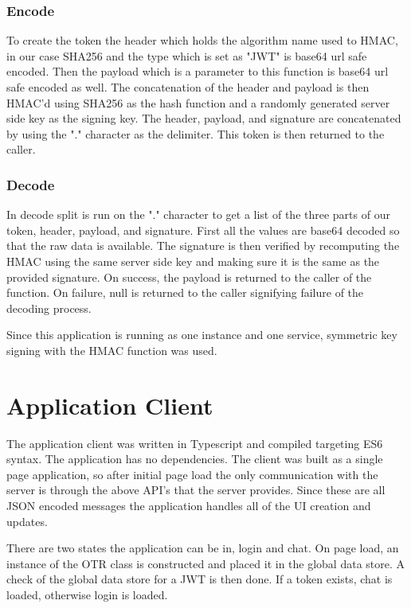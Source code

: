 \subsubsection{Encode}


To create the token the header which holds the algorithm name used to HMAC, in our case SHA256 and the type which is set as "JWT" is base64 url safe encoded. Then the payload which is a parameter to this function is base64 url safe encoded as well. The concatenation of the header and payload is then HMAC'd using SHA256 as the hash function and a randomly generated server side key as the signing key. The header, payload, and signature are concatenated by using the "." character as the delimiter. This token is then returned to the caller.


\subsubsection{Decode}


In decode split is run on the "." character to get a list of the three parts of our token, header, payload, and signature. First all the values are base64 decoded so that the raw data is available. The signature is then verified by recomputing the HMAC using the same server side key and making sure it is the same as the provided signature. On success, the payload is returned to the caller of the function. On failure, null is returned to the caller signifying failure of the decoding process.


Since this application is running as one instance and one service, symmetric key signing with the HMAC function was used. 


\section{Application Client}


The application client was written in Typescript and compiled targeting ES6 syntax. The application has no dependencies. The client was built as a single page application, so after initial page load the only communication with the server is through the above API's that the server provides. Since these are all JSON encoded messages the application handles all of the UI creation and updates.


There are two states the application can be in, login and chat. On page load, an instance of the OTR class is constructed and placed it in the global data store. A check of the global data store for a JWT is then done. If a token exists, chat is loaded, otherwise login is loaded.


